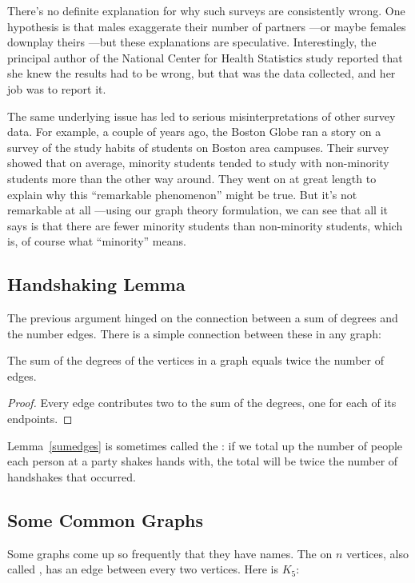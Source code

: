 There's no definite explanation for why such surveys are consistently wrong.  One
hypothesis is that males exaggerate their number of partners ---or maybe females
downplay theirs ---but these explanations are speculative.  Interestingly, the
principal author of the National Center for Health Statistics study reported that she
knew the results had to be wrong, but that was the data collected, and her job was to
report it.

The same underlying issue has led to serious misinterpretations of other survey data.
For example, a couple of years ago, the Boston Globe ran a story on a survey of the
study habits of students on Boston area campuses.  Their survey showed that on average,
minority students tended to study with non-minority students more than the other way
around.  They went on at great length to explain why this ``remarkable phenomenon''
might be true.  But it's not remarkable at all ---using our graph theory formulation,
we can see that all it says is that there are fewer minority students than non-minority
students, which is, of course what ``minority'' means.

\subsection{Handshaking Lemma}
The previous argument hinged on the connection between a sum of degrees and the number
edges.  There is a simple connection between these in any graph:

\begin{lemma}\label{sumedges}
The sum of the degrees of the vertices in a graph equals twice the number of edges.
\end{lemma}

\begin{proof}
Every edge contributes two to the sum of the degrees, one for each of its endpoints.
\end{proof}

Lemma~\ref{sumedges} is sometimes called the : if we total up the
number of people each person at a party shakes hands with, the total will be twice the
number of handshakes that occurred.

\subsection{Some Common Graphs}
Some graphs come up so frequently that they have names.  The
 on $n$ vertices, also called , has an edge
between every two vertices.  Here is $K_5$:

